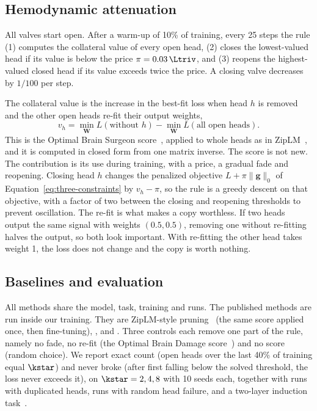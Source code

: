 \subsection{Hemodynamic attenuation}
\label{sec:rule}

All valves start open. After a warm-up of 10\% of training, every 25 steps the rule (1) computes the collateral value of every open head, (2) closes the lowest-valued head if its value is below the price $\pi=0.03\,\Ltriv$, and (3) reopens the highest-valued closed head if its value exceeds twice the price. A closing valve decreases by $1/100$ per step.

The collateral value is the increase in the best-fit loss when head $h$ is removed and the other open heads re-fit their output weights,
\begin{equation}
  v_h = \min_{\bm W} L(\text{without } h) - \min_{\bm W} L(\text{all open heads}).
  \label{eq:collateral}
\end{equation}
This is the Optimal Brain Surgeon score~\citep{obs}, applied to whole heads as in ZipLM~\citep{ziplm}, and it is computed in closed form from one matrix inverse. The score is not new. The contribution is its use during training, with a price, a gradual fade and reopening. Closing head $h$ changes the penalized objective $L+\pi\lVert\bm g\rVert_0$ of Equation~\eqref{eq:three-constraints} by $v_h-\pi$, so the rule is a greedy descent on that objective, with a factor of two between the closing and reopening thresholds to prevent oscillation. The re-fit is what makes a copy worthless. If two heads output the same signal with weights $(0.5, 0.5)$, removing one without re-fitting halves the output, so both look important. With re-fitting the other head takes weight 1, the loss does not change and the copy is worth nothing.

\subsection{Baselines and evaluation}

All methods share the model, task, training and runs. The published methods are run inside our training. They are ZipLM-style pruning~\citep{ziplm} (the same score applied once, then fine-tuning), \citet{michel2019sixteen}, and \citet{voita2019analyzing}. Three controls each remove one part of the rule, namely no fade, no re-fit (the Optimal Brain Damage score~\citep{obd}) and no score (random choice). We report exact count (open heads over the last 40\% of training equal $\kstar$) and never broke (after first falling below the solved threshold, the loss never exceeds it), on $\kstar = 2, 4, 8$ with 10 seeds each, together with runs with duplicated heads, runs with random head failure, and a two-layer induction task~\citep{olsson2022}.

